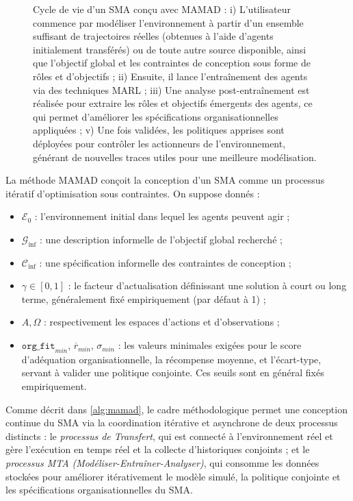 \begin{figure}[h!]
    \centering
    
    \caption[Cycle de vie d'un SMA conçu avec MAMAD]{Cycle de vie d'un SMA conçu avec MAMAD : i) L'utilisateur commence par modéliser l'environnement à partir d'un ensemble suffisant de trajectoires réelles (obtenues à l'aide d'agents initialement transférés) ou de toute autre source disponible, ainsi que l'objectif global et les contraintes de conception sous forme de rôles et d'objectifs ; \quad ii) Ensuite, il lance l'entraînement des agents via des techniques MARL ; \quad iii) Une analyse post-entraînement est réalisée pour extraire les rôles et objectifs émergents des agents, ce qui permet d'améliorer les spécifications organisationnelles appliquées ; \quad v) Une fois validées, les politiques apprises sont déployées pour contrôler les actionneurs de l'environnement, générant de nouvelles traces utiles pour une meilleure modélisation.}
    \label{fig:cycle}
\end{figure}

La méthode \ac{MAMAD} conçoit la conception d'un \ac{SMA} comme un processus itératif d'optimisation sous contraintes. On suppose donnés :
\begin{itemize}
    \item $\mathcal{E}_0$ : l'environnement initial dans lequel les agents peuvent agir ;
    \item $\mathcal{G}_{\text{inf}}$ : une description informelle de l'objectif global recherché ;
    \item $\mathcal{C}_{\text{inf}}$ : une spécification informelle des contraintes de conception ;
    \item $\gamma \in [0,1]$ : le facteur d'actualisation définissant une solution à court ou long terme, généralement fixé empiriquement (par défaut à 1) ;
    \item $A, \Omega$ : respectivement les espaces d'actions et d'observations ;
    \item $\texttt{org\_fit}_{min}$, $\overline{r}_{min}$, $\sigma_{min}$ : les valeurs minimales exigées pour le score d'adéquation organisationnelle, la récompense moyenne, et l'écart-type, servant à valider une politique conjointe. Ces seuils sont en général fixés empiriquement.
\end{itemize}

\noindent Comme décrit dans \autoref{alg:mamad}, le cadre méthodologique permet une conception continue du \ac{SMA} via la coordination itérative et asynchrone de deux processus distincts : le \textit{processus de Transfert}, qui est connecté à l'environnement réel et gère l'exécution en temps réel et la collecte d'historiques conjoints ; et le \textit{processus \ac{MTA} (Modéliser-Entraîner-Analyser)}, qui consomme les données stockées pour améliorer itérativement le modèle simulé, la politique conjointe et les spécifications organisationnelles du \ac{SMA}.

